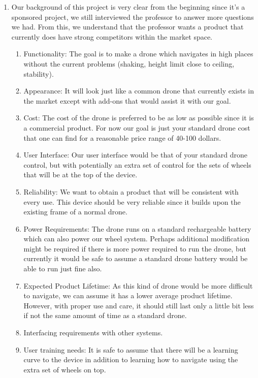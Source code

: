 \documentclass[12pt]{article}
\begin{document}
\begin{enumerate}[label=\Alph*.]
                \item Our background of this project is very clear from the beginning since it's a sponsored project, we still interviewed the professor to answer more questions we had.
                From this, we understand that the professor wants a product that currently does have strong competitors within the market space. 
                \begin{enumerate}[label=\roman*.]
                    \item Functionality: The goal is to make a drone which navigates in high places without the current problems (shaking, height limit close to ceiling, stability).
                    \item Appearance: It will look just like a common drone that currently exists in the market except with add-ons that would assist it with our goal.
                    \item Cost: The cost of the drone is preferred to be as low as possible since it is a commercial product.
                    For now our goal is just your standard drone cost that one can find for a reasonable price range of 40-100 dollars.
                    \item User Interface: Our user interface would be that of your standard drone control, but with potentially an extra set of control for the sets of wheels that will be at the top of the device.
                    \item Reliability: We want to obtain a product that will be consistent with every use.
                    This device should be very reliable since it builds upon the existing frame of a normal drone.
                    \item Power Requirements: The drone runs on a standard rechargeable battery which can also power our wheel system. Perhaps additional modification might be required if there is more power required to run the drone, but currently it would be safe to assume a standard drone battery would be able to run just fine also.
                    \item Expected Product Lifetime: As this kind of drone would be more difficult to navigate, we can assume it has a lower average product lifetime.
                    However, with proper use and care, it should still last only a little bit less if not the same amount of time as a standard drone.
                    \item Interfacing requirements with other systems.
                    \item User training needs: It is safe to assume that there will be a learning curve to the device in addition to learning how to navigate using the extra set of wheels on top.

\end{enumerate}
\end{enumerate}
\end{document}
